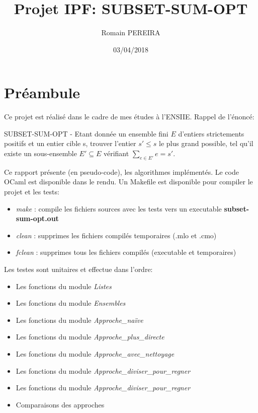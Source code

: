 \documentclass[10pt]{article}
\title{Projet IPF: SUBSET-SUM-OPT}
\author{Romain PEREIRA}
\date{03/04/2018}
\begin{document}
	\maketitle
	\tableofcontents

	\newpage
	\section{Préambule}

		Ce projet est réalisé dans le cadre de mes études à l'ENSIIE. Rappel de l'énoncé:
		
		\begin{addmargin}[2em]{0em}
			SUBSET-SUM-OPT - Etant donnée un ensemble fini $E$ d'entiers
			strictements positifs et un entier cible s, trouver l'entier
			$s' \leq s$ le plus grand possible, tel qu'il existe un
			sous-ensemble $E' \subseteq E$ vérifiant $\sum_{e \in E'}{e} = s'$.
			\newline
		\end{addmargin}
		Ce rapport présente (en pseudo-code), les algorithmes implémentés.
		\newline
		Le code OCaml est disponible dans le rendu.
		\newline
		Un Makefile est disponible pour compiler le projet et les tests:
		\begin{itemize}[label=-]
			\setlength\itemsep{0.1em}
			\item \textit{make} : compile les fichiers sources avec les tests vers un executable \textbf{subset-sum-opt.out}
			\item \textit{clean} : supprimes les fichiers compilés temporaires (.mlo et .cmo)
			\item \textit{fclean} : supprimes tous les fichiers compilés (executable et temporaires)
		\end{itemize}
		Les testes sont unitaires et effectue dans l'ordre:
		\begin{itemize}[label=-]
			\item Les fonctions du module \textit{Listes}
			\item Les fonctions du module \textit{Ensembles}
			\item Les fonctions du module \textit{Approche\_naïve}
			\item Les fonctions du module \textit{Approche\_plus\_directe}
			\item Les fonctions du module \textit{Approche\_avec\_nettoyage}
			\item Les fonctions du module \textit{Approche\_diviser\_pour\_regner}
			\item Les fonctions du module \textit{Approche\_diviser\_pour\_regner}
			\item Comparaisons des approches
		\end{itemize}
\end{document}
